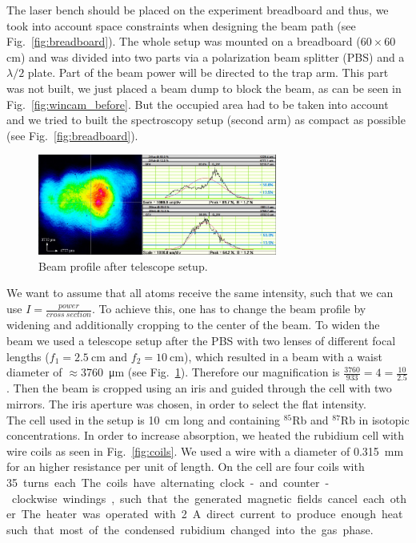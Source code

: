 The laser bench should be placed on the experiment breadboard and thus, we took
into account space constraints when designing the beam path (see Fig.~\ref{fig:breadboard}).
The whole setup was mounted on a breadboard (\(60 \times 60 \)\si{\centi\meter}) 
and was divided into two parts via a polarization beam splitter (PBS) and a 
\(\lambda/2\) plate. Part of the beam power will be directed to the trap arm. 
This part was not built, we just placed a beam dump to block the beam, as can be 
seen in Fig.~\ref{fig:wincam_before}. But the occupied area had to be taken into 
account and we tried to built the spectroscopy setup (second arm) as compact as 
possible (see Fig.~\ref{fig:breadboard}).

\begin{figure}[H]
    \centering
    \includegraphics[width=0.7\textwidth]{beam_widened} 
    \caption{\label{fig:beam_widened} Beam profile after telescope setup.}
\end{figure}

We want to assume that all atoms receive the same intensity, such that we can 
use \(I = \frac{power}{cross~section} \). To achieve this, one has to change the 
beam profile by widening and additionally cropping to the center of the beam. 
To widen the beam we used a telescope setup after the PBS
with two lenses of different focal lengths (\(f_1 = \SI{2.5}{\centi\meter} 
\text{ and } f_2 = \SI{10}{\centi\meter}\)), which resulted in a beam with a waist
diameter of \(\approx \)\SI{3760}{\micro\meter} (see Fig.~\ref{fig:beam_widened}).
Therefore our magnification is \(\frac{3760}{933} = 4 = \frac{10}{2.5}\). Then 
the beam is cropped using an iris and guided through the cell with two mirrors. 
The iris aperture was chosen, in order to select the flat intensity.\\
The cell used in the setup is \SI{10}{\centi\meter} long and containing \(^{85}\)Rb
and \(^{87}\)Rb in isotopic concentrations. In order to increase absorption, we 
heated the rubidium cell with wire coils as seen in Fig.~\ref{fig:coils}. 
We used a wire with a diameter of \SI{0.315}{\milli\meter} for an higher resistance 
per unit of length. On the cell are four coils with \SI{35} turns each. The coils 
have alternating clock- and counter-clockwise windings, such that the generated 
magnetic fields cancel each other. The heater was operated with \SI{2}{\ampere} 
direct current to produce enough heat such that most of the condensed rubidium 
changed into the gas phase.

